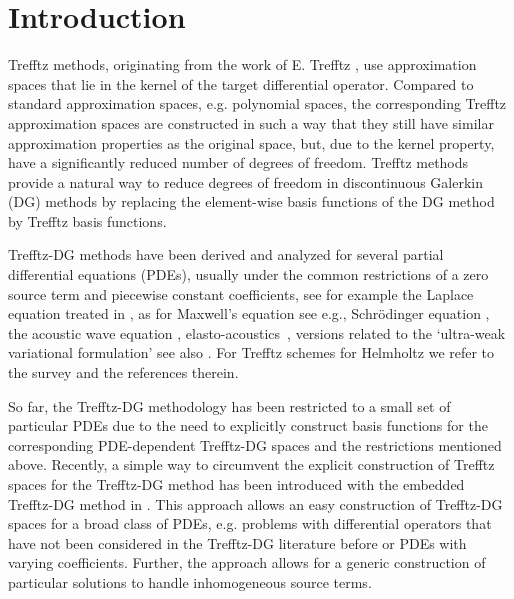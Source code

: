 \documentclass[pdflatex,sn-mathphys,Numbered]{sn-jnl}%
\theoremstyle{remark}%
\theoremstyle{definition}%
\begin{document}
\section{Introduction}
Trefftz methods, originating from the work of E. Trefftz
\cite{trefftz1926}, use approximation spaces that lie in the kernel of
the target differential operator. 
Compared to standard approximation spaces, e.g. polynomial spaces, the corresponding Trefftz approximation spaces are constructed in such a way that they still have similar approximation properties as the original space, but, due to the kernel property, have a significantly reduced number of degrees of freedom.
Trefftz methods provide a natural way to reduce
degrees of freedom in discontinuous Galerkin (DG) methods by replacing
the element-wise basis functions of the DG method by Trefftz basis
functions. 

Trefftz-DG methods have been derived and analyzed for several partial
differential equations (PDEs), usually under the common restrictions of
a zero source term and piecewise constant coefficients, see for
example the Laplace equation treated in \cite{HMPS14},
as
for Maxwell's equation see e.g.\cite{EKSW15, Huttunen}, Schr\"odinger
equation \cite{2306.09571,21M1426079}, the acoustic wave equation
\cite{mope18,bgl2016}, elasto-acoustics~\cite{bcds20}, versions
related to the `ultra-weak variational formulation' see also
\cite{SpaceTimeTDG,mope18,bcds20,KSTW2014,EKSW15,tpwave}.
For Trefftz schemes for Helmholtz we refer to the survey
\cite{TrefftzSurvey} and the references therein.

So far, the Trefftz-DG methodology has been restricted to a small set
of particular PDEs due to the need to explicitly construct basis
functions for the corresponding PDE-dependent Trefftz-DG spaces and
the restrictions mentioned above.  
Recently, a simple way to circumvent the explicit construction of
Trefftz spaces for the Trefftz-DG method has been introduced with the
embedded Trefftz-DG method in \cite{2201.07041}. This approach allows
an easy construction of Trefftz-DG spaces for a broad class of PDEs,
e.g. problems with differential operators that have not been
considered in the Trefftz-DG literature before or PDEs with varying
coefficients. Further, the approach allows for a generic construction
of particular solutions to handle inhomogeneous source terms.
\end{document}
